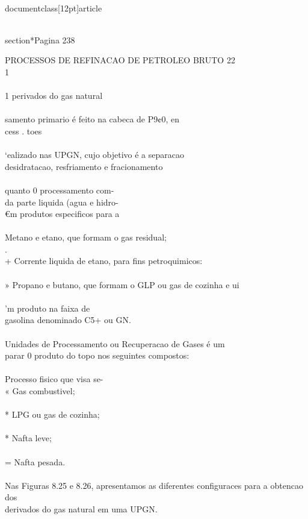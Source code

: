 \\documentclass[12pt]{article}
\begin{document}
\\section*{Pagina 238}

PROCESSOS DE REFINACAO DE PETROLEO BRUTO 22\\
1\\
\\
1 perivados do gas natural\\
\\
samento primario é feito na cabeca de P9¢0, en\\
cess . toes\\
\\
‘ealizado nas UPGN, cujo objetivo é a separacao\\
desidratacao, resfriamento e fracionamento\\
\\
quanto 0 processamento com-\\
da parte liquida (agua e hidro-\\
€m produtos especificos para a\\
\\
Metano e etano, que formam o gas residual;\\
.\\
+ Corrente liquida de etano, para fins petroquimicos:\\
\\
» Propano e butano, que formam o GLP ou gas de cozinha e ui\\
\\
'm produto na faixa de\\
gasolina denominado C5+ ou GN.\\
\\
Unidades de Processamento ou Recuperacao de Gases é um\\
parar 0 produto do topo nos seguintes compostos:\\
\\
Processo fisico que visa se-\\
« Gas combustivel;\\
\\
* LPG ou gas de cozinha;\\
\\
* Nafta leve;\\
\\
= Nafta pesada.\\
\\
Nas Figuras 8.25 e 8.26, apresentamos as diferentes configuraces para a obtencao dos\\
derivados do gas natural em uma UPGN.\\
\\
\end{document}
